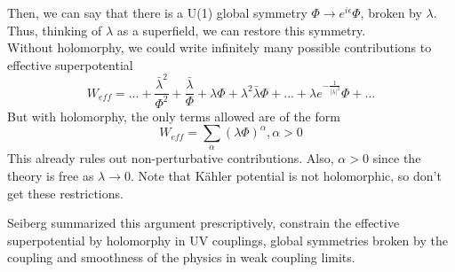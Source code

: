 \documentclass[type = bachelor]{fduthesis-en}
\begin{document}
Then, we can say that there is a U(1) global symmetry $\Phi\rightarrow e^{i\epsilon}\Phi$, broken by $\lambda$. Thus, thinking of $\lambda$ as a superfield, we can restore this symmetry.\\
Without holomorphy, we could write infinitely many possible contributions to effective superpotential
\begin{equation}
W_{eff}=...+\frac{\bar{\lambda}^2}{\Phi^2}+\frac{\bar{\lambda}}{\Phi}+\lambda\Phi+\lambda^2\bar{\lambda}\Phi+...+\lambda e^{-\frac{1}{|\lambda|^2}}\Phi+...
\end{equation}
But with holomorphy, the only terms allowed are of the form
\begin{equation}
W_{eff}=\sum_\alpha(\lambda\Phi)^\alpha, \alpha>0
\end{equation}
This already rules out non-perturbative contributions. Also, $\alpha>0$ since the theory is free as $\lambda\rightarrow0$. Note that K\"{a}hler potential is not holomorphic, so don't get these restrictions.

Seiberg summarized this argument prescriptively, constrain the effective superpotential by holomorphy in UV couplings, global symmetries broken by the coupling and smoothness of the physics in weak coupling limits.
\end{document}
